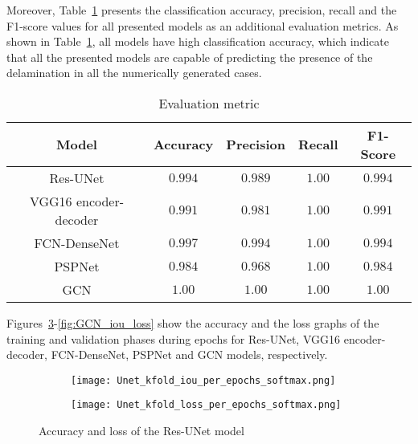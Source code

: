 Moreover, Table~\ref{tab:evaluation_metric} presents the classification accuracy, precision, recall and the F1-score values for all presented models as an additional evaluation metrics.
As shown in Table~\ref{tab:evaluation_metric}, all models have high classification accuracy, which indicate that all the presented models are capable of predicting the presence of the delamination in all the numerically generated cases. 
\begin{table}[]
	\centering
	\caption{Evaluation metric}
	\label{tab:evaluation_metric}
	\resizebox{\textwidth}{!}
	{
		\begin{tabular}{ccccc} \hline
			Model& Accuracy & Precision & Recall & F1-Score \\ \hline
			Res-UNet & \(0.994\)  & \(0.989\) &  \(1.00\)  & \(0.994\)  \\ 
			VGG16 encoder-decoder & \(0.991\)  & \(0.981\) & \(1.00\) &  \(0.991\)\\ 
			FCN-DenseNet & \(0.997\)  & \(0.994\) & \(1.00\)  & \(0.994\) \\ 
			PSPNet & \(0.984\) & \(0.968\) & \(1.00\) & \(0.984\) \\ 
			GCN & \(1.00\) & \(1.00\) & \(1.00\) & \(1.00\) \\ \hline
		\end{tabular}
	}
\end{table}
Figures~\ref{fig:res_unet_iou_loss}-\ref{fig:GCN_iou_loss} show the accuracy and the loss graphs of the training and validation phases during epochs for Res-UNet, VGG16 encoder-decoder, FCN-DenseNet, PSPNet and GCN models, respectively.
\begin{figure} [!h]
	\centering
	\begin{subfigure}[b]{0.47\textwidth}
	 \centering		\texttt{[image: Unet\_kfold\_iou\_per\_epochs\_softmax.png]}	\caption{}
	 \label{fig:unet_accuracy_metric}
	\end{subfigure}
	\hfill	
	\begin{subfigure}[b]{0.47\textwidth}
	 \centering
	 \texttt{[image: Unet\_kfold\_loss\_per\_epochs\_softmax.png]}
	 \caption{}
	 \label{fig:unet_loss_metric}
	\end{subfigure}
	\caption{Accuracy and loss of the Res-UNet model}
	\label{fig:res_unet_iou_loss}
\end{figure}
